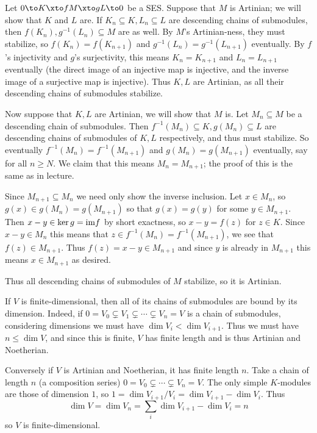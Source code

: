     \item Let $0\to K\xto fM\xto gL\to0$ be a SES.
    Suppose that $M$ is Artinian; we will show that $K$ and $L$ are.
    If $K_n\subseteq K,L_n\subseteq L$ are descending chains of submodules, then $f(K_n),g^{-1}(L_n)\subseteq M$
    are as well.
    By $M$'s Artinian-ness, they must stabilize, so $f(K_n)=f(K_{n+1})$ and $g^{-1}(L_n)=g^{-1}(L_{n+1})$ eventually.
    By $f$'s injectivity and $g$'s surjectivity, this means $K_n=K_{n+1}$ and $L_n=L_{n+1}$ eventually
    (the direct image of an injective map is injective, and the inverse image of a surjective map is injective).
    Thus $K,L$ are Artinian, as all their descending chains of submodules stabilize.

    Now suppose that $K,L$ are Artinian, we will show that $M$ is.
    Let $M_n\subseteq M$ be a descending chain of submodules.
    Then $f^{-1}(M_n)\subseteq K,g(M_n)\subseteq L$ are descending chains of submodules of $K,L$ respectively,
    and thus must stabilize.
    So eventually $f^{-1}(M_n)=f^{-1}(M_{n+1})$ and $g(M_n)=g(M_{n+1})$ eventually, say for all $n\geq N$.
    We claim that this means $M_n=M_{n+1}$; the proof of this is the same as in lecture.

    Since $M_{n+1}\subseteq M_n$ we need only show the inverse inclusion.
    Let $x\in M_n$, so $g(x)\in g(M_n)=g(M_{n+1})$ so that $g(x)=g(y)$ for some $y\in M_{n+1}$.
    Then $x-y\in\mathop{\rm ker} g={\rm im} f$ by short exactness, so $x-y=f(z)$ for $z\in K$.
    Since $x-y\in M_n$ this means that $z\in f^{-1}(M_n)=f^{-1}(M_{n+1})$, we see that $f(z)\in M_{n+1}$.
    Thus $f(z)=x-y\in M_{n+1}$ and since $y$ is already in $M_{n+1}$ this means $x\in M_{n+1}$ as desired.

    Thus all descending chains of submodules of $M$ stabilize, so it is Artinian.

    \item If $V$ is finite-dimensional, then all of its chains of submodules are bound by its dimension.
    Indeed, if $0=V_0\subsetneq V_1\subsetneq\cdots\subsetneq V_n=V$ is a chain of submodules, considering dimensions
    we must have $\dim V_i<\dim V_{i+1}$.
    Thus we must have $n\leq\dim V$, and since this is finite, $V$ has finite length and is thus Artinian and Noetherian.

    Conversely if $V$ is Artinian and Noetherian, it has finite length $n$.
    Take a chain of length $n$ (a composition series) $0=V_0\subsetneq\cdots\subsetneq V_n=V$.
    The only simple $K$-modules are those of dimension $1$, so $1=\dim V_{i+1}/V_i=\dim V_{i+1}-\dim V_i$.
    Thus
    $$ \dim V = \dim V_n = \sum_i \dim V_{i+1} - \dim V_i = n $$
    so $V$ is finite-dimensional.

